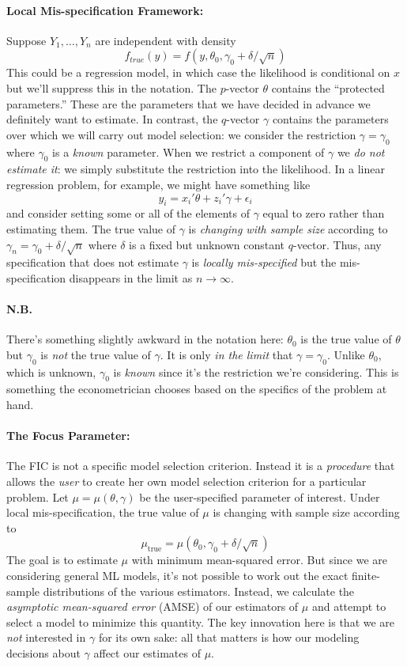 \documentclass[12pt]{article}
\theoremstyle{definition}
\begin{document}
\paragraph{Local Mis-specification Framework:}
Suppose $Y_1, \hdots, Y_n$ are independent with density
	$$f_{true}(y)=f(y, \theta_0, \gamma_0 + \delta/\sqrt{n})$$
This could be a regression model, in which case the likelihood is conditional on $x$ but we'll suppress this in the notation. The $p$-vector $\theta$ contains the ``protected parameters.'' These are the parameters that we have decided in advance we definitely want to estimate. In contrast, the $q$-vector $\gamma$ contains the parameters over which we will carry out model selection: we consider the restriction $\gamma = \gamma_0$ where $\gamma_0$ is a \emph{known} parameter. When we restrict a component of $\gamma$ we \emph{do not estimate it}: we simply substitute the restriction into the likelihood. In a linear regression problem, for example, we might have something like
	$$y_i = x_i'\theta + z_i'\gamma + \epsilon_i$$
and consider setting some or all of the elements of $\gamma$ equal to zero rather than estimating them.  The true value of $\gamma$ is \emph{changing with sample size} according to $\gamma_n = \gamma_0 + \delta/\sqrt{n}$ where $\delta$ is a fixed but unknown constant $q$-vector. Thus, any specification that does not estimate $\gamma$ is \emph{locally mis-specified} but the mis-specification disappears in the limit as $n\rightarrow \infty$. 

\paragraph{N.B.} There's something slightly awkward in the notation here: $\theta_0$ is the true value of $\theta$ but $\gamma_0$ is \emph{not} the true value of $\gamma$. It is only \emph{in the limit} that $\gamma = \gamma_0$. Unlike $\theta_0$, which is unknown, $\gamma_0$ is \emph{known} since it's the restriction we're considering. This is something the econometrician chooses based on the specifics of the problem at hand.

\paragraph{The Focus Parameter:} The FIC is not a specific model selection criterion. Instead it is a \emph{procedure} that allows the \emph{user} to create her own model selection criterion for a particular problem. Let $\mu = \mu(\theta, \gamma)$ be the user-specified parameter of interest. Under local mis-specification, the true value of $\mu$ is changing with sample size according to
	$$\mu_{\mbox{true}} = \mu\left(\theta_0, \gamma_0 + \delta/\sqrt{n}\right)$$ 
The goal is to estimate $\mu$ with minimum mean-squared error. But since we are considering general ML models, it's not possible to work out the exact finite-sample distributions of the various estimators. Instead, we calculate the \emph{asymptotic mean-squared error} (AMSE) of our estimators of $\mu$ and attempt to select a model to minimize this quantity. The key innovation here is that we are \emph{not} interested in $\gamma$ for its own sake: all that matters is how our modeling decisions about $\gamma$ affect our estimates of $\mu$.
\end{document}
